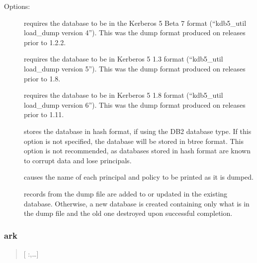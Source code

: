 \documentclass[letterpaper,10pt,english]{sphinxmanual}
\begin{document}
\sphinxAtStartPar
Options:
\begin{description}
\item[{}] \leavevmode
\sphinxAtStartPar
requires the database to be in the Kerberos 5 Beta 7 format
(“kdb5\_util load\_dump version 4”).  This was the dump format
produced on releases prior to 1.2.2.

\item[{}] \leavevmode
\sphinxAtStartPar
requires the database to be in Kerberos 5 1.3 format (“kdb5\_util
load\_dump version 5”).  This was the dump format produced on
releases prior to 1.8.

\item[{}] \leavevmode
\sphinxAtStartPar
requires the database to be in Kerberos 5 1.8 format (“kdb5\_util
load\_dump version 6”).  This was the dump format produced on
releases prior to 1.11.

\item[{}] \leavevmode
\sphinxAtStartPar
stores the database in hash format, if using the DB2 database
type.  If this option is not specified, the database will be
stored in btree format.  This option is not recommended, as
databases stored in hash format are known to corrupt data and lose
principals.

\item[{}] \leavevmode
\sphinxAtStartPar
causes the name of each principal and policy to be printed as it
is dumped.

\item[{}] \leavevmode
\sphinxAtStartPar
records from the dump file are added to or updated in the existing
database.  Otherwise, a new database is created containing only
what is in the dump file and the old one destroyed upon successful
completion.

\end{description}


\subsubsection{ark}
\label{\detokenize{admin/admin_commands/kdb5_util:ark}}\label{\detokenize{admin/admin_commands/kdb5_util:kdb5-util-load-end}}\begin{quote}

\sphinxAtStartPar
{} {[} :,…{]} 
\end{quote}
\end{document}
